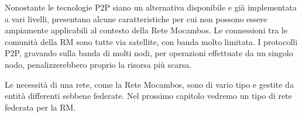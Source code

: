 Nonostante le tecnologie P2P siano un alternativa disponibile e già
implementata a vari livelli, presentano alcune caratteristiche per cui
non possono essere ampiamente applicabili al contesto della Rete
Mocambos. Le connessioni tra le comunità della RM sono tutte via
satellite, con banda molto limitata. I protocolli P2P, gravando sulla
banda di molti nodi, per operazioni effettuate da un singolo nodo,
penalizzerebbero proprio la risorsa più scarsa. 

Le necessità di una rete, come la Rete Mocambos, sono di vario tipo e
gestite da entità differenti sebbene federate. Nel prossimo capitolo
vedremo un tipo di rete federata per la RM.

